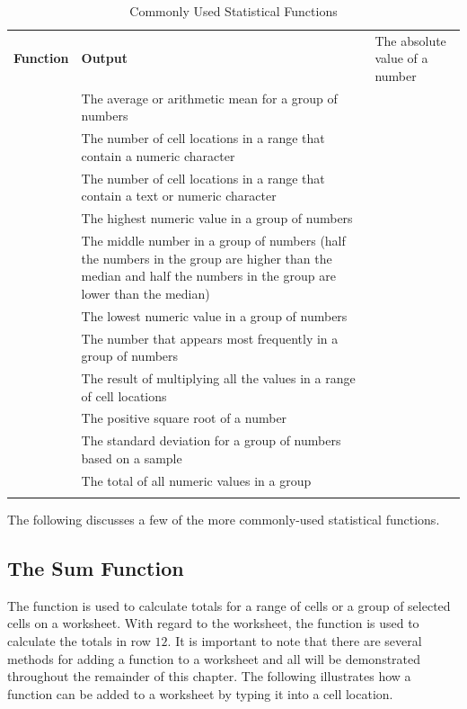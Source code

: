 \begin{table}[H]
	{\small
		\begin{longtable}{L{0.75in}L{3.50in}} %
			\textbf{Function} & \textbf{Output} \endhead
			\hline
			 & The absolute value of a number\\
			 & The average or arithmetic mean for a group of numbers\\
			 & The number of cell locations in a range that contain a numeric character\\
			 & The number of cell locations in a range that contain a text or numeric character\\
			 & The highest numeric value in a group of numbers\\
			 & The middle number in a group of numbers (half the numbers in the group are higher than the median and half the numbers in the group are lower than the median)\\
			 & The lowest numeric value in a group of numbers\\
			 & The number that appears most frequently in a group of numbers\\
			 & The result of multiplying all the values in a range of cell locations\\
			 & The positive square root of a number\\
			 & The standard deviation for a group of numbers based on a sample\\
			 & The total of all numeric values in a group\\
			\caption{Commonly Used Statistical Functions}
			\label{02:tab04}
		\end{longtable}
	} %
\end{table}

The following discusses a few of the more commonly-used statistical functions.

\subsection{The Sum Function}

The  function is used to calculate totals for a range of cells or a group of selected cells on a worksheet. With regard to the  worksheet, the  function is used to calculate the totals in row $ 12 $. It is important to note that there are several methods for adding a function to a worksheet and all will be demonstrated throughout the remainder of this chapter. The following illustrates how a function can be added to a worksheet by typing it into a cell location.

